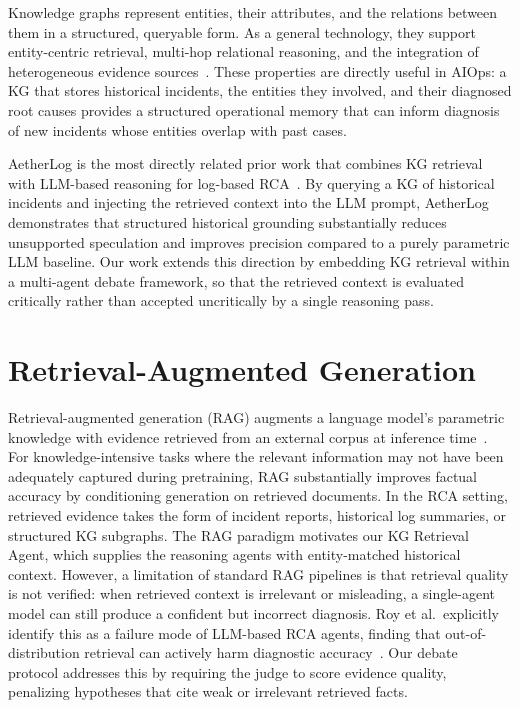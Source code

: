 Knowledge graphs represent entities, their attributes, and the relations between them in a
structured, queryable form. As a general technology, they support entity-centric retrieval,
multi-hop relational reasoning, and the integration of heterogeneous evidence
sources~\cite{hogan2021knowledge}. These properties are directly useful in AIOps: a KG that
stores historical incidents, the entities they involved, and their diagnosed root causes provides
a structured operational memory that can inform diagnosis of new incidents whose entities overlap
with past cases.

AetherLog is the most directly related prior work that combines KG retrieval with LLM-based
reasoning for log-based RCA~\cite{cui2025aetherlog}. By querying a KG of historical incidents and
injecting the retrieved context into the LLM prompt, AetherLog demonstrates that structured
historical grounding substantially reduces unsupported speculation and improves precision compared
to a purely parametric LLM baseline. Our work extends this direction by embedding KG retrieval
within a multi-agent debate framework, so that the retrieved context is evaluated critically
rather than accepted uncritically by a single reasoning pass.

\section{Retrieval-Augmented Generation}

Retrieval-augmented generation (RAG) augments a language model's parametric knowledge with
evidence retrieved from an external corpus at inference
time~\cite{lewis2021retrievalaugmentedgenerationknowledgeintensivenlp}. For knowledge-intensive
tasks where the relevant information may not have been adequately captured during pretraining, RAG
substantially improves factual accuracy by conditioning generation on retrieved documents. In the
RCA setting, retrieved evidence takes the form of incident reports, historical log summaries, or
structured KG subgraphs. The RAG paradigm motivates our KG Retrieval Agent, which supplies the
reasoning agents with entity-matched historical context. However, a limitation of standard RAG
pipelines is that retrieval quality is not verified: when retrieved context is irrelevant or
misleading, a single-agent model can still produce a confident but incorrect diagnosis. Roy et
al.\ explicitly identify this as a failure mode of LLM-based RCA agents, finding that
out-of-distribution retrieval can actively harm diagnostic
accuracy~\cite{roy2024llmagentRCA}. Our debate protocol addresses this by requiring the judge to
score evidence quality, penalizing hypotheses that cite weak or irrelevant retrieved facts.

